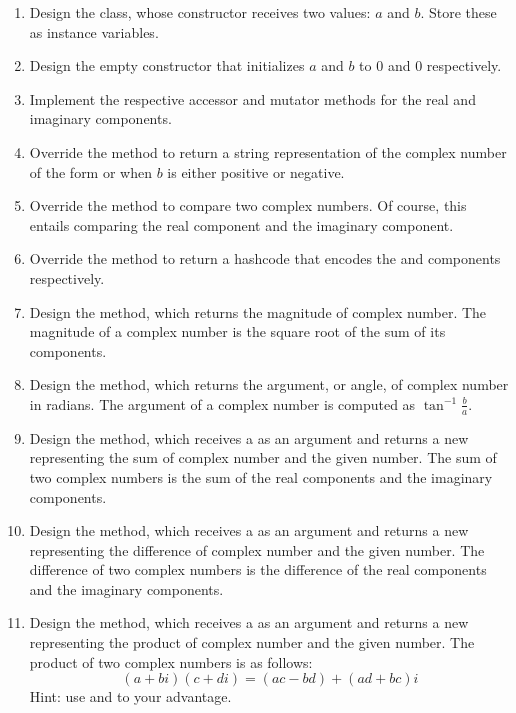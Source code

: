 \begin{enumerate}[label=(\alph*)]
    \item Design the  class, whose constructor receives two  values: $a$ and $b$. Store these as instance variables.
    \item Design the empty constructor that initializes $a$ and $b$ to $0$ and $0$ respectively. 
    \item Implement the respective accessor and mutator methods for the real and imaginary components.
    \item Override the  method to return a string representation of the complex number of the form  or  when $b$ is either positive or negative. 
    \item Override the  method to compare two complex numbers. Of course, this entails comparing the real component and the imaginary component.
    \item Override the  method to return a hashcode that encodes the  and  components respectively.
    \item Design the  method, which returns the magnitude of  complex number. The magnitude of a complex number is the square root of the sum of its components.
    \item Design the  method, which returns the argument, or angle, of  complex number in radians. The argument of a complex number is computed as $\tan^{-1}{\frac{b}{a}}$.
    \item Design the  method, which receives a  as an argument and returns a new  representing the sum of  complex number and the given number. The sum of two complex numbers is the sum of the real components and the imaginary components.
    \item Design the  method, which receives a  as an argument and returns a new  representing the difference of  complex number and the given number. The difference of two complex numbers is the difference of the real components and the imaginary components.
    \item Design the  method, which receives a  as an argument and returns a new  representing the product of  complex number and the given number. The product of two complex numbers is as follows:
    \[
        (a + bi)(c + di) = (ac - bd) + (ad + bc)i    
    \]
    Hint: use  and  to your advantage.
\end{enumerate}